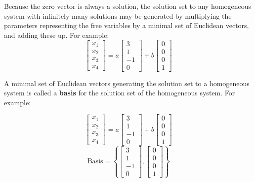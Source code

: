 \begin{applicationActivities}{3}{6}
\begin{fact}
  Because the zero vector is always a solution,
  the solution set to any homogeneous system with infinitely-many solutions
  may be generated by multiplying the parameters representing the free variables
  by a minimal set of Euclidean vectors, and adding these up. For example:
  \[
    \begin{bmatrix}
      x_1 \\
      x_2 \\
      x_3 \\
      x_4
    \end{bmatrix}=
    a\begin{bmatrix}
      3 \\
      1 \\
      -1 \\
      0
    \end{bmatrix}+
    b\begin{bmatrix}
      0 \\
      0 \\
      0 \\
      1
    \end{bmatrix}
  \]
\end{fact}

\begin{definition}
  A minimal set of Euclidean vectors generating the solution set to a
  homogeneous system is called a \textbf{basis} for the solution
  set of the homogeneous system. For example:
  \begin{multicols}{2}\noindent
  \[
    \begin{bmatrix}
      x_1 \\
      x_2 \\
      x_3 \\
      x_4
    \end{bmatrix}=
    a\begin{bmatrix}
      3 \\
      1 \\
      -1 \\
      0
    \end{bmatrix}+
    b\begin{bmatrix}
      0 \\
      0 \\
      0 \\
      1
    \end{bmatrix}
  \]
  \[
    \textrm{Basis}=\left\{
    \begin{bmatrix}
      3 \\
      1 \\
      -1 \\
      0
    \end{bmatrix},
    \begin{bmatrix}
      0 \\
      0 \\
      0 \\
      1
    \end{bmatrix}\right\}
  \]
  \end{multicols}
\end{definition}


\end{applicationActivities}
